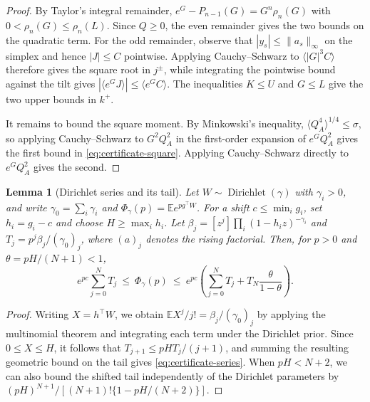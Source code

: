 \documentclass{article}
\numberwithin{equation}{section}
\newtheorem{lemma}[theorem]{Lemma}
\theoremstyle{remark}
\newcommand{\E}{\mathbb E}
\begin{document}
\begin{proof}
By Taylor's integral remainder,
$e^G-P_{n-1}(G)=G^n\rho_n(G)$ with $0<\rho_n(G)\le\rho_n(L)$.
Since $Q\ge0$, the even remainder gives the two bounds on the quadratic
term. For the odd remainder, observe that $|y_s|\le\|a_s\|_\infty$
on the simplex and hence $|J|\le C$ pointwise. Applying Cauchy--Schwarz
to $\langle |G|^3 C\rangle$ therefore gives the square root in $j^\pm$,
while integrating the pointwise bound against the tilt gives
$|\langle e^G J\rangle|\le\langle e^G C\rangle$. The inequalities
$K\le U$ and $G\le L$ give the two upper bounds in $k^+$.

It remains to bound the square moment. By Minkowski's inequality,
$\langle Q_A^4\rangle^{1/4}\le\sigma$, so applying Cauchy--Schwarz
to $G^2 Q_A^2$ in the first-order expansion of $e^GQ_A^2$ gives
the first bound in \eqref{eq:certificate-square}. Applying
Cauchy--Schwarz directly to $e^G Q_A^2$ gives the second.
\end{proof}

\begin{lemma}[Dirichlet series and its tail]\label{lem:dirichlet-series}
Let $W\sim\operatorname{Dirichlet}(\gamma)$ with $\gamma_i>0$, and
write $\gamma_0=\sum_i\gamma_i$ and $\Phi_\gamma(p)=\E e^{pg^\top W}$.
For a shift $c\le\min_i g_i$, set $h_i=g_i-c$ and choose
$H\ge\max_i h_i$. Let $\beta_j=[z^j]\prod_i(1-h_i z)^{-\gamma_i}$
and $T_j=p^j\beta_j/(\gamma_0)_j$, where $(a)_j$ denotes the rising
factorial. Then, for $p>0$ and $\theta=pH/(N+1)<1$,
\begin{equation}
 e^{pc}\sum_{j=0}^N T_j\ \le\ \Phi_\gamma(p)\ \le\
 e^{pc}\left(\sum_{j=0}^N T_j+
      T_N\frac{\theta}{1-\theta}\right).
 \label{eq:certificate-series}
\end{equation}
\end{lemma}
\begin{proof}
Writing $X=h^\top W$, we obtain $\E X^j/j!=\beta_j/(\gamma_0)_j$
by applying the multinomial theorem and integrating each term under
the Dirichlet prior. Since $0\le X\le H$, it follows that
$T_{j+1}\le pH T_j/(j+1)$, and summing the resulting geometric bound
on the tail gives \eqref{eq:certificate-series}. When $pH<N+2$, we
can also bound the shifted tail independently of the Dirichlet
parameters by $(pH)^{N+1}/[(N+1)!\{1-pH/(N+2)\}]$.
\end{proof}
\end{document}
